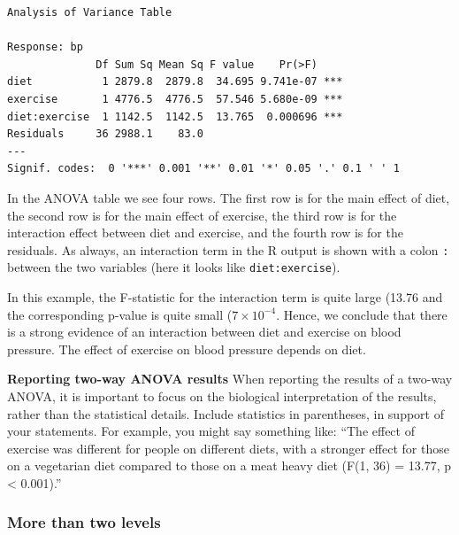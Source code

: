 \documentclass[
  letterpaper,
  8pt,
  a4paper]{book}
\begin{document}
\begin{verbatim}
Analysis of Variance Table

Response: bp
              Df Sum Sq Mean Sq F value    Pr(>F)    
diet           1 2879.8  2879.8  34.695 9.741e-07 ***
exercise       1 4776.5  4776.5  57.546 5.680e-09 ***
diet:exercise  1 1142.5  1142.5  13.765  0.000696 ***
Residuals     36 2988.1    83.0                      
---
Signif. codes:  0 '***' 0.001 '**' 0.01 '*' 0.05 '.' 0.1 ' ' 1
\end{verbatim}

In the ANOVA table we see four rows. The first row is for the main
effect of diet, the second row is for the main effect of exercise, the
third row is for the interaction effect between diet and exercise, and
the fourth row is for the residuals. As always, an interaction term in
the R output is shown with a colon \texttt{:} between the two variables
(here it looks like \texttt{diet:exercise}).

In this example, the F-statistic for the interaction term is quite large
(13.76 and the corresponding p-value is quite small
(\ensuremath{7\times 10^{-4}}. Hence, we conclude that there is a strong
evidence of an interaction between diet and exercise on blood pressure.
The effect of exercise on blood pressure depends on diet.

\begin{tcolorbox}[enhanced jigsaw, arc=.35mm, bottomrule=.15mm, bottomtitle=1mm, breakable, colback=white, colbacktitle=quarto-callout-important-color!10!white, colframe=quarto-callout-important-color-frame, coltitle=black, left=2mm, leftrule=.75mm, opacityback=0, opacitybacktitle=0.6, rightrule=.15mm, title=\textcolor{quarto-callout-important-color}{\faExclamation}\hspace{0.5em}{Important}, titlerule=0mm, toprule=.15mm, toptitle=1mm]

\textbf{Reporting two-way ANOVA results} When reporting the results of a
two-way ANOVA, it is important to focus on the biological interpretation
of the results, rather than the statistical details. Include statistics
in parentheses, in support of your statements. For example, you might
say something like: ``The effect of exercise was different for people on
different diets, with a stronger effect for those on a vegetarian diet
compared to those on a meat heavy diet (F(1, 36) = 13.77, p \textless{}
0.001).''

\end{tcolorbox}

\subsubsection*{More than two levels}\label{more-than-two-levels}
\end{document}
